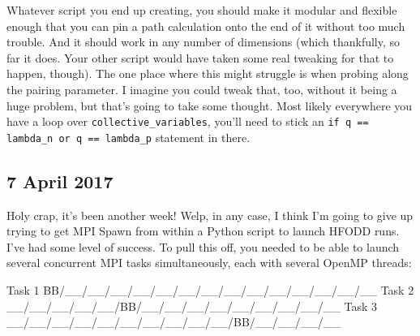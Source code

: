 \documentclass[]{report}
\begin{document}
Whatever script you end up creating, you should make it modular and flexible enough that you can pin a path calculation onto the end of it without too much trouble. And it should work in any number of dimensions (which thankfully, so far it does. Your other script would have taken some real tweaking for that to happen, though). The one place where this might struggle is when probing along the pairing parameter. I imagine you could tweak that, too, without it being a huge problem, but that's going to take some thought. Most likely everywhere you have a loop over \texttt{collective\_variables}, you'll need to stick an \texttt{if q == lambda\_n or q == lambda\_p} statement in there.

\subsection*{7 April 2017}
Holy crap, it's been another week! Welp, in any case, I think I'm going to give up trying to get MPI Spawn from within a Python script to launch HFODD runs. I've had some level of success. To pull this off, you needed to be able to launch several concurrent MPI tasks simultaneously, each with several OpenMP threads:

\begin{verbatim*}
Task 1 BB/__/__/__/__/__/__/__/__/__/__/__/__/__/__
Task 2 __/__/__/__/__/BB/__/__/__/__/__/__/__/__/__
Task 3 __/__/__/__/__/__/__/__/__/__/BB/__/__/__/__
\end{verbatim*}
\end{document}
